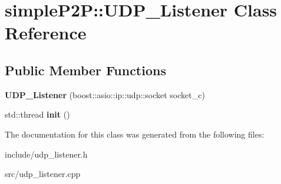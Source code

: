 \hypertarget{classsimpleP2P_1_1UDP__Listener}{}\section{simple\+P2P\+:\+:U\+D\+P\+\_\+\+Listener Class Reference}
\label{classsimpleP2P_1_1UDP__Listener}
\subsection*{Public Member Functions}
\begin{DoxyCompactItemize}
\item 
\mbox{\label{classsimpleP2P_1_1UDP__Listener_a21ac027c28d246f1cf639e21c33daf96}} 
{\bfseries U\+D\+P\+\_\+\+Listener} (boost\+::asio\+::ip\+::udp\+::socket socket\+\_\+c)
\item 
\mbox{\label{classsimpleP2P_1_1UDP__Listener_a9dc307293f4b431407b21623430e45d1}} 
std\+::thread {\bfseries init} ()
\end{DoxyCompactItemize}


The documentation for this class was generated from the following files\+:\begin{DoxyCompactItemize}
\item 
include/udp\+\_\+listener.\+h\item 
src/udp\+\_\+listener.\+cpp\end{DoxyCompactItemize}
